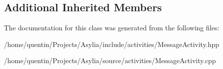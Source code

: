 \subsection*{Additional Inherited Members}


The documentation for this class was generated from the following files\-:\begin{DoxyCompactItemize}
\item 
/home/quentin/\-Projects/\-Asylia/include/activities/Message\-Activity.\-hpp\item 
/home/quentin/\-Projects/\-Asylia/source/activities/Message\-Activity.\-cpp\end{DoxyCompactItemize}
